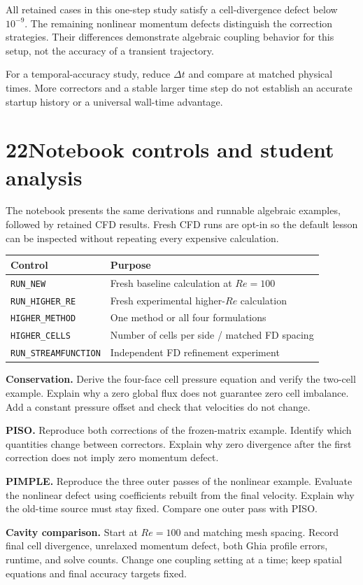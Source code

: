 \documentclass[11pt]{article}
\newcommand{\topic}[2]{\section*{#1\quad #2}}
\begin{document}
All retained cases in this one-step study satisfy a cell-divergence defect below $10^{-9}$. The remaining nonlinear momentum defects distinguish the correction strategies. Their differences demonstrate algebraic coupling behavior for this setup, not the accuracy of a transient trajectory.

For a temporal-accuracy study, reduce $\Delta t$ and compare at matched physical times. More correctors and a stable larger time step do not establish an accurate startup history or a universal wall-time advantage.
\newpage
\topic{22}{Notebook controls and student analysis}
The notebook presents the same derivations and runnable algebraic examples, followed by retained CFD results. Fresh CFD runs are opt-in so the default lesson can be inspected without repeating every expensive calculation.
\begin{center}\begin{tabular}{ll}\toprule
Control & Purpose\\\midrule
\texttt{RUN\_NEW} & Fresh baseline calculation at $Re=100$\\
\texttt{RUN\_HIGHER\_RE} & Fresh experimental higher-$Re$ calculation\\
\texttt{HIGHER\_METHOD} & One method or all four formulations\\
\texttt{HIGHER\_CELLS} & Number of cells per side / matched FD spacing\\
\texttt{RUN\_STREAMFUNCTION} & Independent FD refinement experiment\\\bottomrule
\end{tabular}\end{center}
\textbf{Conservation.} Derive the four-face cell pressure equation and verify the two-cell example. Explain why a zero global flux does not guarantee zero cell imbalance. Add a constant pressure offset and check that velocities do not change.

\textbf{PISO.} Reproduce both corrections of the frozen-matrix example. Identify which quantities change between correctors. Explain why zero divergence after the first correction does not imply zero momentum defect.

\textbf{PIMPLE.} Reproduce the three outer passes of the nonlinear example. Evaluate the nonlinear defect using coefficients rebuilt from the final velocity. Explain why the old-time source must stay fixed. Compare one outer pass with PISO.

\textbf{Cavity comparison.} Start at $Re=100$ and matching mesh spacing. Record final cell divergence, unrelaxed momentum defect, both Ghia profile errors, runtime, and solve counts. Change one coupling setting at a time; keep spatial equations and final accuracy targets fixed.
\end{document}
